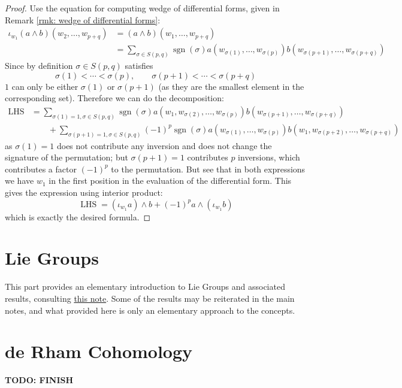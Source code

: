 \documentclass{article}
\begin{document}
\begin{proof}
    Use the equation for computing wedge of differential forms, given in Remark \ref{rmk: wedge of differential forms}:
    \begin{align*}
        \iota_{w_1}(a \wedge b)(w_2, \dots, w_{p+q})
        & = (a \wedge b) (w_1, \dots, w_{p+q}) \\
        & = \sum_{\sigma \in S(p, q)} \operatorname{sgn}(\sigma) a(w_{\sigma(1)}, \dots, w_{\sigma(p)}) b(w_{\sigma(p+1)}, \dots, w_{\sigma(p+q)}) 
    \end{align*}
    Since by definition $\sigma \in S(p, q)$ satisfies
    \[
        \sigma(1) < \cdots < \sigma(p), \qquad \sigma(p+1) < \cdots < \sigma(p+q)
    \]
    $1$ can only be either $\sigma(1)$ or $\sigma(p+1)$ (as they are the smallest element in the corresponding set). Therefore we can do the decomposition:
    \begin{align*}
        \operatorname{LHS} 
        & = \sum_{\sigma(1) = 1, \sigma \in S(p, q)} \operatorname{sgn}(\sigma) a(w_{1}, w_{\sigma(2)}, \dots, w_{\sigma(p)}) b(w_{\sigma(p+1)}, \dots, w_{\sigma(p+q)}) \\
        & \qquad + \sum_{\sigma(p+1) = 1, \sigma \in S(p, q)} (-1)^p\operatorname{sgn}(\sigma) a(w_{\sigma(1)}, \dots, w_{\sigma(p)}) b(w_1, w_{\sigma(p+2)}, \dots, w_{\sigma(p+q)}) 
    \end{align*}
    as $\sigma(1) = 1$ does not contribute any inversion and does not change the signature of the permutation; but $\sigma(p+1) = 1$ contributes $p$ inversions, which contributes a factor $(-1)^p$ to the permutation. But see that in both expressions we have $w_1$ in the first position in the evaluation of the differential form. This gives the expression using interior product:
    \[
        \operatorname{LHS} = (\iota_{w_1} a) \wedge b + (-1)^p a \wedge (\iota_{w_1} b)
    \]
    which is exactly the desired formula. 
\end{proof}

\section{Lie Groups}

\textstart
This part provides an elementary introduction to Lie Groups and associated results, consulting \href{https://scholar.rose-hulman.edu/rhumj/vol15/iss2/5}{this note}. Some of the results may be reiterated in the main notes, and what provided here is only an elementary approach to the concepts. 

\section{de Rham Cohomology}

\textbf{TODO: FINISH}
\end{document}
